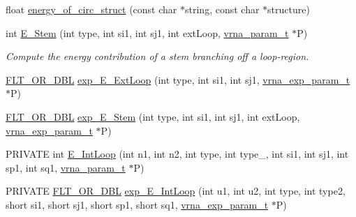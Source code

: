 \begin{DoxyCompactItemize}
\item 
float \hyperlink{group__eval__deprecated_ga657222e2758c46bf13b416ef3032e417}{energy\+\_\+of\+\_\+circ\+\_\+struct} (const char $\ast$string, const char $\ast$structure)
\item 
int \hyperlink{group__eval__deprecated_ga51f9851f3500c2aae66674142a6a2dd5}{E\+\_\+\+Stem} (int type, int si1, int sj1, int ext\+Loop, \hyperlink{group__energy__parameters_ga8a69ca7d787e4fd6079914f5343a1f35}{vrna\+\_\+param\+\_\+t} $\ast$P)
\begin{DoxyCompactList}\small\item\em Compute the energy contribution of a stem branching off a loop-\/region. \end{DoxyCompactList}\item 
\hyperlink{group__data__structures_ga31125aeace516926bf7f251f759b6126}{F\+L\+T\+\_\+\+O\+R\+\_\+\+D\+BL} \hyperlink{group__eval__deprecated_ga446828a191c127861e76e2c84055f672}{exp\+\_\+\+E\+\_\+\+Ext\+Loop} (int type, int si1, int sj1, \hyperlink{group__energy__parameters_ga01d8b92fe734df8d79a6169482c7d8d8}{vrna\+\_\+exp\+\_\+param\+\_\+t} $\ast$P)
\item 
\hyperlink{group__data__structures_ga31125aeace516926bf7f251f759b6126}{F\+L\+T\+\_\+\+O\+R\+\_\+\+D\+BL} \hyperlink{group__eval__deprecated_gab0aa9833ab41875a91a9be8a5ffd7092}{exp\+\_\+\+E\+\_\+\+Stem} (int type, int si1, int sj1, int ext\+Loop, \hyperlink{group__energy__parameters_ga01d8b92fe734df8d79a6169482c7d8d8}{vrna\+\_\+exp\+\_\+param\+\_\+t} $\ast$P)
\item 
P\+R\+I\+V\+A\+TE int \hyperlink{group__eval__deprecated_gaafbc187b7f78e8e82afb77dd6f3b8fc5}{E\+\_\+\+Int\+Loop} (int n1, int n2, int type, int type\+\_, int si1, int sj1, int sp1, int sq1, \hyperlink{group__energy__parameters_ga8a69ca7d787e4fd6079914f5343a1f35}{vrna\+\_\+param\+\_\+t} $\ast$P)
\item 
P\+R\+I\+V\+A\+TE \hyperlink{group__data__structures_ga31125aeace516926bf7f251f759b6126}{F\+L\+T\+\_\+\+O\+R\+\_\+\+D\+BL} \hyperlink{group__eval__deprecated_ga95de54d8a2a17645a95e0f34e189d9c9}{exp\+\_\+\+E\+\_\+\+Int\+Loop} (int u1, int u2, int type, int type2, short si1, short sj1, short sp1, short sq1, \hyperlink{group__energy__parameters_ga01d8b92fe734df8d79a6169482c7d8d8}{vrna\+\_\+exp\+\_\+param\+\_\+t} $\ast$P)
\end{DoxyCompactItemize}
